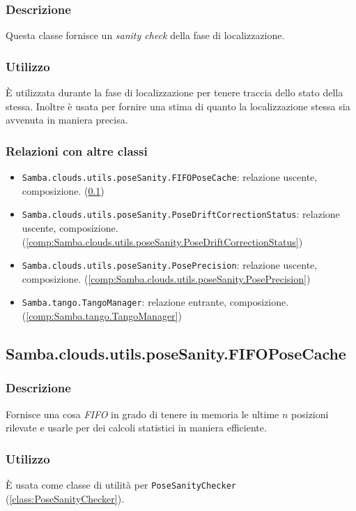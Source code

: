 \subsubsection{Descrizione}
Questa classe fornisce un \emph{sanity check} della fase di localizzazione.
\subsubsection{Utilizzo}
È utilizzata durante la fase di localizzazione per tenere traccia dello stato della stessa. Inoltre è usata per fornire una stima di quanto la localizzazione stessa sia avvenuta in maniera precisa.
\subsubsection{Relazioni con altre classi}
\begin{itemize}
	\item \texttt{Samba.clouds.utils.poseSanity.FIFOPoseCache}: relazione uscente, composizione. (\ref{comp:Samba.clouds.utils.poseSanity.FIFOPoseCache})
	\item \texttt{Samba.clouds.utils.poseSanity.PoseDriftCorrectionStatus}: relazione uscente, composizione. (\ref{comp:Samba.clouds.utils.poseSanity.PoseDriftCorrectionStatus})
	\item \texttt{Samba.clouds.utils.poseSanity.PosePrecision}: relazione uscente, composizione. (\ref{comp:Samba.clouds.utils.poseSanity.PosePrecision})
	\item \texttt{Samba.tango.TangoManager}: relazione entrante, composizione. (\ref{comp:Samba.tango.TangoManager})
\end{itemize}

\subsection{Samba.clouds.utils.poseSanity.FIFOPoseCache}\label{comp:Samba.clouds.utils.poseSanity.FIFOPoseCache}
\subsubsection{Descrizione}
Fornisce una cosa \emph{FIFO} in grado di tenere in memoria le ultime $n$ posizioni rilevate e usarle per dei calcoli statistici in maniera efficiente.
\subsubsection{Utilizzo}
È usata come classe di utilità per \texttt{PoseSanityChecker} (\ref{class:PoseSanityChecker}).
